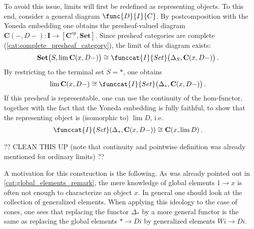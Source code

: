     To avoid this issue, limits will first be redefined as representing objects. To this end, consider a general diagram $\func{D}{I}{C}$. By postcomposition with the Yoneda embedding one obtains the presheaf-valued diagram $\mathbf{C}(-,D-):\mathbf{I}\rightarrow[\mathbf{C}^{op}, \mathbf{Set}]$. Since presheaf categories are complete (\cref{cat:complete_presheaf_category}), the limit of this diagram exists: \[\mathbf{Set}\big(S,\lim\mathbf{C}(x,D-)\big)\cong\funccat{I}{Set}\bigl(\Delta_S,\mathbf{C}(x,D-)\bigr)\,.\] By restricting to the terminal set $S=\ast$, one obtains \[\lim\mathbf{C}(x,D-)\cong\funccat{I}{Set}\bigl(\Delta_\ast,\mathbf{C}(x,D-)\bigr)\,.\] If this presheaf is representable, one can use the continuity of the hom-functor, together with the fact that the Yoneda embedding is fully faithful, to show that the representing object is (isomorphic to) $\lim D$, i.e.
    \begin{gather}
        \funccat{I}{Set}(\Delta_\ast,\mathbf{C}(x,D-))\cong\mathbf{C}(x,\lim D)\,.
    \end{gather}

    ?? CLEAN THIS UP (note that continuity and pointwise definition was already mentioned for ordinary limits) ??


    \begin{remark}
        A motivation for this construction is the following. As was already pointed out in \cref{cat:global_elements_remark}, the mere knowledge of global elements $1\rightarrow x$ is often not enough to characterize an object $x$. In general one should look at the collection of generalized elements. When applying this ideology to the case of cones, one sees that replacing the functor $\Delta_\ast$ by a more general functor is the same as replacing the global elements $\ast\rightarrow Di$ by generalized elements $Wi\rightarrow Di$.
    \end{remark}

